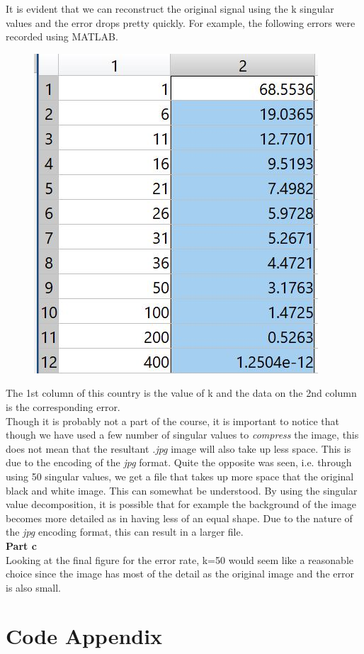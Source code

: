 \documentclass[a4paper]{article}
\begin{document}
\begin{Large}
\begin{figure}[!h]
\begin{center}
	\end{center}
\end{figure}
It is evident that we can reconstruct the original signal using the k singular values and the error drops pretty quickly. For example, the following errors were recorded using MATLAB. 
\begin{figure}[!h]
	\begin{center}
		\includegraphics[scale=.45]{err}
	\end{center}
\end{figure}
The 1st column of this country is the value of k and the data on the 2nd column is the corresponding error.\\
Though it is probably not a part of the course, it is important to notice that though we have used a few number of singular values to \textit{compress} the image, this does not mean that the resultant \textit{.jpg} image will also take up less space. This is due to the encoding of the \textit{jpg} format. Quite the opposite was seen, i.e. through using 50 singular values, we get a file that takes up more space that the original black and white image. This can somewhat be understood. By using the singular value decomposition, it is possible that for example the background of the image becomes more detailed as in having less of an equal shape. Due to the nature of the \textit{jpg} encoding format, this can result in a larger file.
	\\\textbf{Part c}\\
	Looking at the final figure for the error rate, k=50 would seem like a reasonable choice since the image has most of the detail as the original image and the error is also small.
	
	
\end{Large}
\newpage
\section*{Code Appendix}

\end{document}
